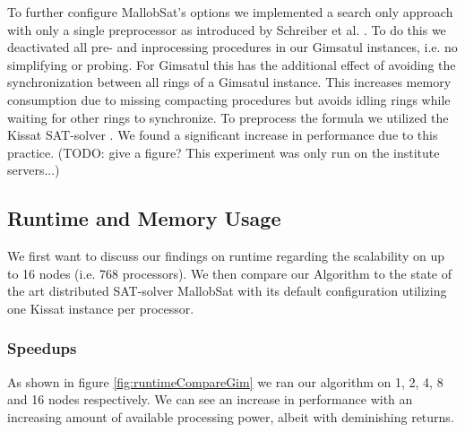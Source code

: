 \documentclass[12pt,a4paper,twoside]{scrartcl}
\numberwithin{equation}{section}
\begin{document}
To further configure MallobSat's options we implemented a search only approach with only a single preprocessor as introduced by Schreiber et al. \cite{searchOnlyPaper}. To do this we deactivated all pre- and inprocessing procedures in our Gimsatul instances, i.e. no simplifying or probing. For Gimsatul this has the additional effect of avoiding the synchronization between all rings of a Gimsatul instance. This increases memory consumption due to missing compacting procedures but avoids idling rings while waiting for other rings to synchronize. To preprocess the formula we utilized the Kissat SAT-solver \cite{kissat}. We found a significant increase in performance due to this practice. (TODO: give a figure? This experiment was only run on the institute servers...)

\subsection{Runtime and Memory Usage}

We first want to discuss our findings on runtime regarding the scalability on up to 16 nodes (i.e. 768 processors). We then compare our Algorithm to the state of the art distributed SAT-solver MallobSat with its default configuration utilizing one Kissat instance per processor.

\subsubsection{Speedups}

As shown in figure \ref{fig:runtimeCompareGim} we ran our algorithm on 1, 2, 4, 8 and 16 nodes respectively. We can see an increase in performance with an increasing amount of available processing power, albeit with deminishing returns.
\end{document}
